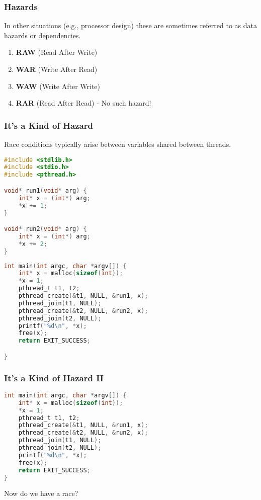 \begin{frame}
\frametitle{Hazards}

In other situations (e.g., processor design) these are sometimes referred to as data hazards or dependencies. 

\begin{enumerate}
	\item \textbf{RAW} (Read After Write)	
	\item \textbf{WAR} (Write After Read)
	\item \textbf{WAW} (Write After Write)
	\item \textbf{RAR} (Read After Read) - No such hazard! 
\end{enumerate}


\end{frame}



\begin{frame}[fragile]
\frametitle{It's a Kind of Hazard}
Race conditions typically arise between variables shared
between threads.

\begin{minipage}[l]{0.39\linewidth}
\begin{lstlisting}[language=C]
#include <stdlib.h>
#include <stdio.h>
#include <pthread.h>

void* run1(void* arg) {
    int* x = (int*) arg;
    *x += 1;
}

void* run2(void* arg) {
    int* x = (int*) arg;
    *x += 2;
}
\end{lstlisting}
\end{minipage}
\begin{minipage}[r]{0.6\linewidth}
\begin{lstlisting}[language=C]
int main(int argc, char *argv[]) {
    int* x = malloc(sizeof(int));
    *x = 1;
    pthread_t t1, t2;
    pthread_create(&t1, NULL, &run1, x);
    pthread_join(t1, NULL);
    pthread_create(&t2, NULL, &run2, x);
    pthread_join(t2, NULL);
    printf("%d\n", *x);
    free(x);
    return EXIT_SUCCESS;

}
\end{lstlisting}
\end{minipage}

\end{frame}



\begin{frame}[fragile]
\frametitle{It's a Kind of Hazard II}

{\scriptsize
\begin{lstlisting}[language=C]
int main(int argc, char *argv[]) {
    int* x = malloc(sizeof(int));
    *x = 1;
    pthread_t t1, t2;
    pthread_create(&t1, NULL, &run1, x);
    pthread_create(&t2, NULL, &run2, x);
    pthread_join(t1, NULL);
    pthread_join(t2, NULL);
    printf("%d\n", *x);
    free(x);
    return EXIT_SUCCESS;
}
\end{lstlisting}
}

Now do we have a race?

\end{frame}



